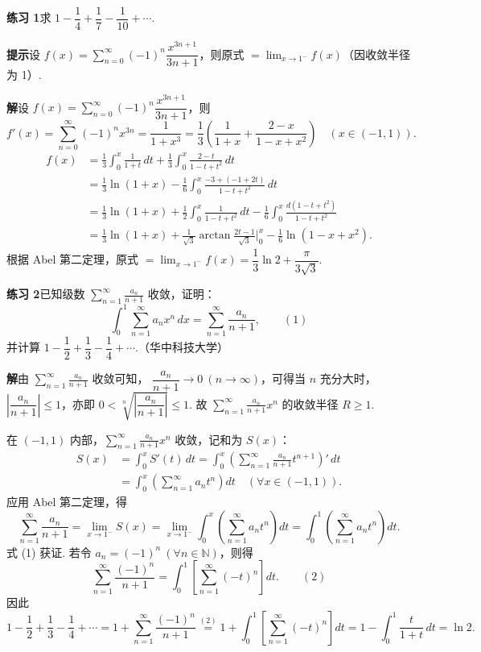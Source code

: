 \documentclass[UTF8,12pt,a4paper,fontset=fandol]{ctexart}
\begin{document}
\noindent\textbf{练习 1}\quad 求 $1-\dfrac14+\dfrac17-\dfrac1{10}+\cdots$.

\noindent\textbf{提示}\quad 设
$f(x)=\displaystyle\sum_{n=0}^{\infty}(-1)^n\dfrac{x^{3n+1}}{3n+1}$，则原式
$=\displaystyle\lim_{x\to1^-}f(x)$（因收敛半径为 1）.

\noindent\textbf{解}\quad 设 $f(x)=\displaystyle\sum_{n=0}^{\infty}(-1)^n\dfrac{x^{3n+1}}{3n+1}$，则
\[
  f'(x)=\sum_{n=0}^{\infty}(-1)^nx^{3n}
  =\frac1{1+x^3}
  =\frac13\left(\frac1{1+x}+\frac{2-x}{1-x+x^2}\right)\quad(x\in(-1,1)).
\]
\[
\begin{aligned}
f(x)
&=\frac13\int_0^x\frac1{1+t}\,dt+\frac13\int_0^x\frac{2-t}{1-t+t^2}\,dt\\
&=\frac13\ln(1+x)-\frac16\int_0^x\frac{-3+(-1+2t)}{1-t+t^2}\,dt\\
&=\frac13\ln(1+x)+\frac12\int_0^x\frac1{1-t+t^2}\,dt
-\frac16\int_0^x\frac{d(1-t+t^2)}{1-t+t^2}\\
&=\frac13\ln(1+x)+\frac1{\sqrt3}\arctan\frac{2t-1}{\sqrt3}\bigg|_0^x
-\frac16\ln(1-x+x^2).
\end{aligned}
\]
根据 Abel 第二定理，原式
$=\displaystyle\lim_{x\to1^-}f(x)=\dfrac13\ln2+\dfrac{\pi}{3\sqrt3}$.

\noindent\textbf{练习 2}\quad 已知级数 $\displaystyle\sum_{n=1}^{\infty}\frac{a_n}{n+1}$ 收敛，证明：
\[
  \int_0^1\sum_{n=1}^{\infty}a_nx^n\,dx=\sum_{n=1}^{\infty}\frac{a_n}{n+1}, \qquad(1)
\]
并计算 $1-\dfrac12+\dfrac13-\dfrac14+\cdots$.（华中科技大学）

\noindent\textbf{解}\quad 由 $\displaystyle\sum_{n=1}^{\infty}\frac{a_n}{n+1}$ 收敛可知，
$\dfrac{a_n}{n+1}\to0\ (n\to\infty)$，可得当 $n$ 充分大时，
$\left|\dfrac{a_n}{n+1}\right|\le1$，亦即
$0<\sqrt[n]{\left|\dfrac{a_n}{n+1}\right|}\le1$. 故
$\displaystyle\sum_{n=1}^{\infty}\frac{a_n}{n+1}x^n$ 的收敛半径 $R\ge1$.

在 $(-1,1)$ 内部，$\displaystyle\sum_{n=1}^{\infty}\frac{a_n}{n+1}x^n$ 收敛，记和为 $S(x)$：
\[
\begin{aligned}
S(x)
&=\int_0^x S'(t)\,dt
=\int_0^x\left(\sum_{n=1}^{\infty}\frac{a_n}{n+1}t^{n+1}\right)'\,dt\\
&=\int_0^x\left(\sum_{n=1}^{\infty}a_nt^n\right)dt\quad(\forall x\in(-1,1)).
\end{aligned}
\]
应用 Abel 第二定理，得
\[
  \sum_{n=1}^{\infty}\frac{a_n}{n+1}
  =\lim_{x\to1^-}S(x)
  =\lim_{x\to1^-}\int_0^x\left(\sum_{n=1}^{\infty}a_nt^n\right)dt
  =\int_0^1\left(\sum_{n=1}^{\infty}a_nt^n\right)dt.
\]
式 (1) 获证. 若令 $a_n=(-1)^n\ (\forall n\in\mathbb N)$，则得
\[
  \sum_{n=1}^{\infty}\frac{(-1)^n}{n+1}
  =\int_0^1\left[\sum_{n=1}^{\infty}(-t)^n\right]dt. \qquad(2)
\]
因此
\[
  1-\frac12+\frac13-\frac14+\cdots
  =1+\sum_{n=1}^{\infty}\frac{(-1)^n}{n+1}
  \stackrel{(2)}{=}1+\int_0^1\left[\sum_{n=1}^{\infty}(-t)^n\right]dt
  =1-\int_0^1\frac{t}{1+t}\,dt=\ln2.
\]
\end{document}
